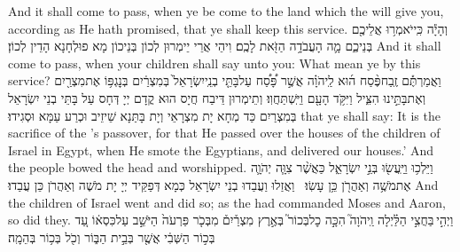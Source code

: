 {And it shall come to pass, when ye be come to the land which the \lord\space will give you, according as He hath promised, that ye shall keep this service.}{}
{וְהָיָ֕ה כִּֽי\maqqaf יֹאמְר֥וּ אֲלֵיכֶ֖ם בְּנֵיכֶ֑ם מָ֛ה הָעֲבֹדָ֥ה הַזֹּ֖את לָכֶֽם׃}
{וִיהֵי אֲרֵי יֵימְרוּן לְכוֹן בְּנֵיכוֹן מָא פוּלְחָנָא הָדֵין לְכוֹן׃}
{And it shall come to pass, when your children shall say unto you: What mean ye by this service?}{}
{וַאֲמַרְתֶּ֡ם זֶֽבַח\maqqaf פֶּ֨סַח ה֜וּא לַֽיהֹוָ֗ה אֲשֶׁ֣ר פָּ֠סַ֠ח עַל\maqqaf בָּתֵּ֤י בְנֵֽי\maqqaf יִשְׂרָאֵל֙ בְּמִצְרַ֔יִם בְּנׇגְפּ֥וֹ אֶת\maqqaf מִצְרַ֖יִם וְאֶת\maqqaf בָּתֵּ֣ינוּ הִצִּ֑יל וַיִּקֹּ֥ד הָעָ֖ם וַיִּֽשְׁתַּחֲוֽוּ׃}
{וְתֵימְרוּן דֵּיבַח חֲיָס הוּא קֳדָם יְיָ דְּחָס עַל בָּתֵּי בְנֵי יִשְׂרָאֵל בְּמִצְרַיִם כַּד מְחָא יָת מִצְרָאֵי וְיָת בָּתַּנָא שֵׁיזֵיב וּכְרַע עַמָּא וּסְגִידוּ׃}
{that ye shall say: It is the sacrifice of the \lord’s passover, for that He passed over the houses of the children of Israel in Egypt, when He smote the Egyptians, and delivered our houses.’ And the people bowed the head and worshipped.}{}
{וַיֵּלְכ֥וּ וַיַּֽעֲשׂ֖וּ בְּנֵ֣י יִשְׂרָאֵ֑ל כַּאֲשֶׁ֨ר צִוָּ֧ה יְהֹוָ֛ה אֶת\maqqaf מֹשֶׁ֥ה וְאַהֲרֹ֖ן כֵּ֥ן עָשֽׂוּ׃ \setuma }
{וַאֲזַלוּ וַעֲבַדוּ בְנֵי יִשְׂרָאֵל כְּמָא דְּפַקֵּיד יְיָ יָת מֹשֶׁה וְאַהֲרֹן כֵּן עֲבַדוּ׃}
{And the children of Israel went and did so; as the \lord\space had commanded Moses and Aaron, so did they.}{}
{וַיְהִ֣י \legarmeh  בַּחֲצִ֣י הַלַּ֗יְלָה וַֽיהֹוָה֮ הִכָּ֣ה כׇל\maqqaf בְּכוֹר֮ בְּאֶ֣רֶץ מִצְרַ֒יִם֒ מִבְּכֹ֤ר פַּרְעֹה֙ הַיֹּשֵׁ֣ב עַל\maqqaf כִּסְא֔וֹ עַ֚ד בְּכ֣וֹר הַשְּׁבִ֔י אֲשֶׁ֖ר בְּבֵ֣ית הַבּ֑וֹר וְכֹ֖ל בְּכ֥וֹר בְּהֵמָֽה׃}

